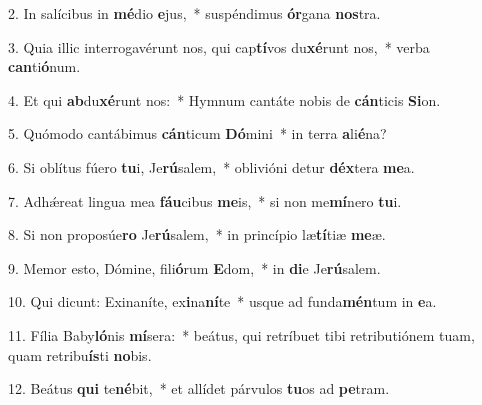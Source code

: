 2. In salícibus in \textbf{mé}dio \textbf{e}jus,~*  suspéndimus \textbf{ór}gana \textbf{nos}tra.\

3. Quia illic interrogavérunt nos, qui cap\textbf{tí}vos du\textbf{xé}runt nos,~*  verba \textbf{can}ti\textbf{ó}num.\

4. Et qui \textbf{ab}du\textbf{xé}runt nos:~*  Hymnum cantáte nobis de \textbf{cán}ticis \textbf{Si}on.\

5. Quómodo cantábimus \textbf{cán}ticum \textbf{Dó}mini~*  in terra \textbf{a}li\textbf{é}na?\

6. Si oblítus fúero \textbf{tu}i, Je\textbf{rú}salem,~*  oblivióni detur \textbf{déx}tera \textbf{me}a.\

7. Adhǽreat lingua mea \textbf{fáu}cibus \textbf{me}is,~*  si non me\textbf{mí}nero \textbf{tu}i.\

8. Si non proposúe\textbf{ro} Je\textbf{rú}salem,~*  in princípio læ\textbf{tí}tiæ \textbf{me}æ.\

9. Memor esto, Dómine, fili\textbf{ó}rum \textbf{E}dom,~*  in \textbf{di}e Je\textbf{rú}salem.\

10. Qui dicunt: Exinaníte, ex\textbf{i}na\textbf{ní}te~*  usque ad funda\textbf{mén}tum in \textbf{e}a.\

11. Fília Baby\textbf{ló}nis \textbf{mí}sera:~*  beátus, qui retríbuet tibi retributiónem tuam, quam retribu\textbf{ís}ti \textbf{no}bis.\

12. Beátus \textbf{qui} te\textbf{né}bit,~*  et allídet párvulos \textbf{tu}os ad \textbf{pe}tram.\

